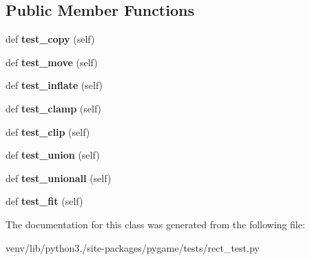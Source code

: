\subsection*{Public Member Functions}
\begin{DoxyCompactItemize}
\item 
\mbox{\label{classpygame_1_1tests_1_1rect__test_1_1_subclass_test_a77dd152f22e7713106e0abdd66a9a1a0}} 
def {\bfseries test\+\_\+copy} (self)
\item 
\mbox{\label{classpygame_1_1tests_1_1rect__test_1_1_subclass_test_a28a94bd944656a885fe0cc85fd99a9e9}} 
def {\bfseries test\+\_\+move} (self)
\item 
\mbox{\label{classpygame_1_1tests_1_1rect__test_1_1_subclass_test_a9427dd56496cbba9e8b1a5441924dbc3}} 
def {\bfseries test\+\_\+inflate} (self)
\item 
\mbox{\label{classpygame_1_1tests_1_1rect__test_1_1_subclass_test_afcf6967405b697f160ea8980837bfcdd}} 
def {\bfseries test\+\_\+clamp} (self)
\item 
\mbox{\label{classpygame_1_1tests_1_1rect__test_1_1_subclass_test_a526f315d1afaf37511248ef576920550}} 
def {\bfseries test\+\_\+clip} (self)
\item 
\mbox{\label{classpygame_1_1tests_1_1rect__test_1_1_subclass_test_ada8787e334b7356225b44015d05a615c}} 
def {\bfseries test\+\_\+union} (self)
\item 
\mbox{\label{classpygame_1_1tests_1_1rect__test_1_1_subclass_test_aee25374b2de91d7e300c61eee081c492}} 
def {\bfseries test\+\_\+unionall} (self)
\item 
\mbox{\label{classpygame_1_1tests_1_1rect__test_1_1_subclass_test_ad5646b5fca4d893ee153c4ee1a7c4004}} 
def {\bfseries test\+\_\+fit} (self)
\end{DoxyCompactItemize}


The documentation for this class was generated from the following file\+:\begin{DoxyCompactItemize}
\item 
venv/lib/python3./site-\/packages/pygame/tests/rect\+\_\+test.\+py\end{DoxyCompactItemize}
